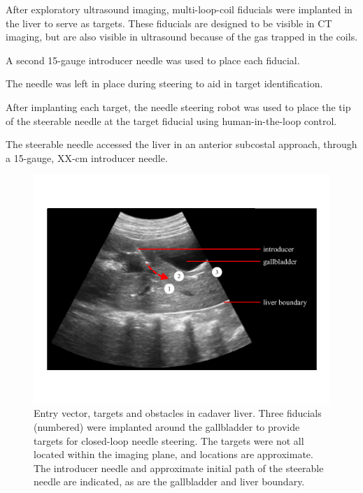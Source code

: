 After exploratory ultrasound imaging, multi-loop-coil fiducials were implanted in the liver to serve as targets. These fiducials are designed to be visible in CT imaging, but are also visible in ultrasound because of the gas trapped in the coils.  

A second 15-gauge introducer needle was used to place each fiducial. 

The needle was left in place during steering to aid in target identification.

After implanting each target, the needle steering robot was used to place the tip of the steerable needle at the target fiducial using human-in-the-loop control. 

The steerable needle accessed the liver in an anterior subcostal approach, through a 15-gauge, XX-cm introducer needle. 

\begin{figure}[!t]
\centering
\includegraphics[width = \columnwidth]{./Images/Chapter5/CadaverTargetsUS/CadaverTargetsUS.pdf}%
\caption[Entry vector, targets and obstacles in cadaver liver]{Entry vector, targets and obstacles in cadaver liver. Three fiducials (numbered) were implanted around the gallbladder to provide targets for closed-loop needle steering. The targets were not all located within the imaging plane, and locations are approximate. The introducer needle and approximate initial path of the steerable needle are indicated, as are the gallbladder and liver boundary. }
\label{fig:CadaverSetup}
\end{figure} 




